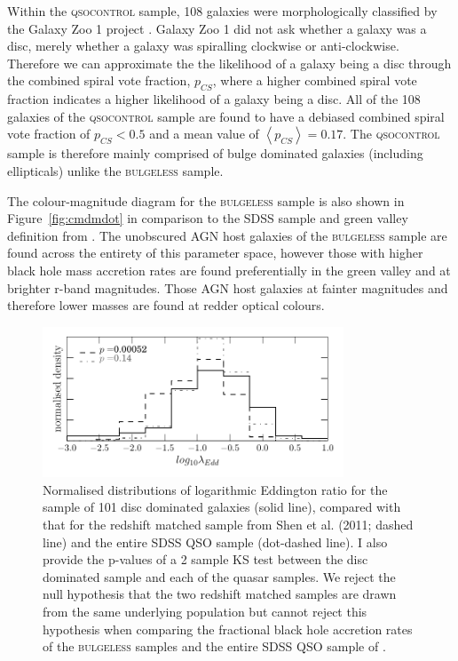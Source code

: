 {Within the \textsc{qsocontrol} sample, 108 galaxies were morphologically classified by the Galaxy Zoo 1 project \cite{lintott08, Lintott11}. Galaxy Zoo 1 did not ask whether a galaxy was a disc, merely whether a galaxy was spiralling clockwise or anti-clockwise. Therefore we can approximate the the likelihood of a galaxy being a disc through the combined spiral vote fraction, $p_{CS}$, where a higher combined spiral vote fraction indicates a higher likelihood of a galaxy being a disc. All of the 108 galaxies of the \textsc{qsocontrol} sample are found to have a debiased combined spiral vote fraction  of $p_{CS} < 0.5$ and a mean value of $\left<p_{CS} \right> = 0.17$.  The \textsc{qsocontrol} sample is therefore mainly comprised of bulge dominated galaxies (including ellipticals) unlike the \textsc{bulgeless} sample. %

The colour-magnitude diagram for the \textsc{bulgeless} sample is also shown in Figure~\ref{fig:cmdmdot} in comparison to the SDSS sample and green valley definition from \citet{Baldry04}. The unobscured AGN host galaxies of the \textsc{bulgeless} sample are found across the entirety of this parameter space, however those with higher black hole mass accretion rates are found preferentially in the green valley and at brighter r-band magnitudes. Those AGN host galaxies at fainter magnitudes and therefore lower masses are found at redder optical colours.


\begin{figure}
\centering
\includegraphics[width=0.8\textwidth]{agn/edd_ratio_z_matched_shen_2011_compare.pdf}
\caption[Eddington ratio distribution of the \textsc{bulgeless} sample]{Normalised distributions of logarithmic Eddington ratio for the sample of 101 disc dominated galaxies (solid line), compared with that for the redshift matched sample from Shen et al. (2011; dashed line) and the entire SDSS QSO sample (dot-dashed line). I also provide the p-values of a 2 sample KS test between the disc dominated sample and each of the quasar samples. We reject the null hypothesis that the two redshift matched samples are drawn from the same underlying population but cannot reject this hypothesis when comparing the fractional black hole accretion rates of the \textsc{bulgeless} samples and the entire SDSS QSO sample of \citet{shen11}.  
}
\label{fig:eddratioshen}
\end{figure}


}
